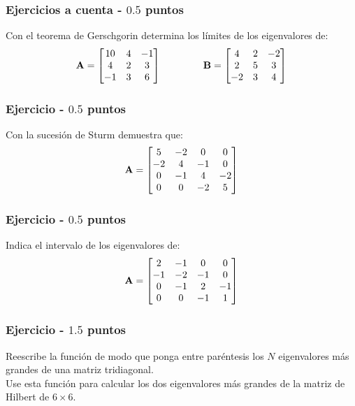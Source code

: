 \documentclass[12pt]{beamer}
\begin{document}
\begin{frame}
\frametitle{Ejercicios a cuenta - $0.5$ puntos}
Con el teorema de Gerschgorin determina los límites de los eigenvalores de:
\begin{align*}
\vb{A} = 
\begin{bmatrix}
10 & 4 & -1 \\
4 & 2 & 3 \\
-1 & 3 & 6
\end{bmatrix}
\hspace{1.5cm}
\vb{B} = 
\begin{bmatrix}
4 & 2 & -2 \\
2 & 5 & 3 \\
-2 & 3 & 4
\end{bmatrix}
\end{align*}
\end{frame}
\begin{frame}
\frametitle{Ejercicio - $0.5$ puntos}
Con la sucesión de Sturm demuestra que:
\begin{align*}
\vb{A} = 
\begin{bmatrix}
5 & -2 & 0 & 0 \\
-2 & 4 & -1 & 0 \\
0 & -1 & 4 & -2 \\
0 & 0 & -2 & 5
\end{bmatrix}
\end{align*}
\end{frame}
\begin{frame}
\frametitle{Ejercicio - $0.5$ puntos}
Indica el intervalo de los eigenvalores de:
\begin{align*}
\vb{A} = 
\begin{bmatrix}
2 & -1 & 0 & 0 \\
-1 & -2 & -1 & 0 \\
0 & -1 & 2 & -1 \\
0 & 0 & -1 & 1
\end{bmatrix}
\end{align*}
\end{frame}
\begin{frame}
\frametitle{Ejercicio - $1.5$ puntos}
Reescribe la función  de modo que ponga entre paréntesis los $N$ eigenvalores más grandes de una matriz tridiagonal.
\\
\bigskip
Use esta función para calcular los dos eigenvalores más grandes de la matriz de Hilbert de $6 \times 6$.
\end{frame}
\end{document}
